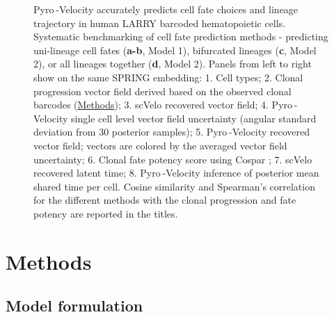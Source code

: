 \documentclass[
  sn-mathphys-num,
  lineno,
  twocolumn]{sn-jnl}
\begin{document}
\begin{figure}


\caption{\label{fig-lineage-tracing}Pyro -Velocity accurately predicts
cell fate choices and lineage trajectory in human LARRY barcoded
hematopoietic cells. Systematic benchmarking of cell fate prediction
methods - predicting uni-lineage cell fates (\textbf{a-b}, Model 1),
bifurcated lineages (\textbf{c}, Model 2), or all lineages together
(\textbf{d}, Model 2). Panels from left to right show on the same SPRING
embedding: 1. Cell types; 2. Clonal progression vector field derived
based on the observed clonal barcodes (\hyperref[sec-methods]{Methods});
3. scVelo recovered vector field; 4. Pyro -Velocity single cell level
vector field uncertainty (angular standard deviation from 30 posterior
samples); 5. Pyro -Velocity recovered vector field; vectors are colored
by the averaged vector field uncertainty; 6. Clonal fate potency score
using Cospar \citep{Wang2022-xb}; 7. scVelo recovered latent time; 8.
Pyro -Velocity inference of posterior mean shared time per cell. Cosine
similarity and Spearman's correlation for the different methods with the
clonal progression and fate potency are reported in the titles.}

\end{figure}%

\FloatBarrier
\clearpage

\newpage{}

\twocolumn

\section{Methods}\label{sec-methods}

\subsection{Model formulation}\label{sec-methods-model}
\end{document}
